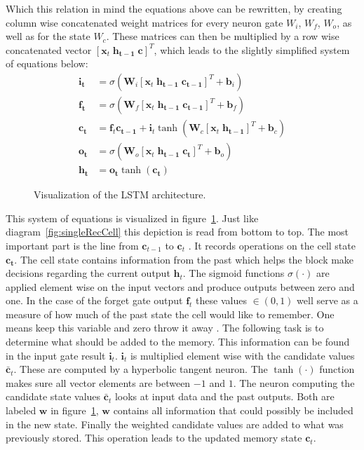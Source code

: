 Which this relation in mind the equations above can be rewritten, by creating column wise concatenated weight matrices for every neuron gate $W_i$, $W_f$, $W_o$, as well as for the state $W_c$. These matrices can then be multiplied by a row wise concatenated vector $[\mathbf{x}_t \; \mathbf{h_{t-1}} \; \mathbf{c}]^T$, which leads to the slightly simplified system of equations below:
\begin{align}
\mathbf{i_t} &= \sigma (\mathbf{W}_i [\mathbf{x}_t \; \mathbf{h_{t-1}} \; \mathbf{c_{t-1}}]^T + \mathbf{b}_i) \\
\mathbf{f_t} &= \sigma (\mathbf{W}_f [\mathbf{x}_t \; \mathbf{h_{t-1}} \; \mathbf{c_{t-1}}]^T + \mathbf{b}_f) \\
\mathbf{c_t} &= \mathbf{f}_t \mathbf{c_{t-1}} + \mathbf{i}_t \tanh( \mathbf{W}_c [\mathbf{x}_t \; \mathbf{h_{t-1}}]^T + \mathbf{b}_c ) \\
\mathbf{o_t} &= \sigma (\mathbf{W}_o [\mathbf{x}_t \; \mathbf{h_{t-1}} \; \mathbf{c_t}]^T + \mathbf{b}_o ) \\
\mathbf{h_t} &= \mathbf{o_t} \tanh(\mathbf{c_t})
\end{align}
\begin{figure}

\caption{Visualization of the LSTM architecture.}
\label{fig:lstm}
\end{figure}
This system of equations is visualized in figure~\ref{fig:lstm}. Just like diagram~\ref{fig:singleRecCell} this depiction is read from bottom to top. The most important part is the line from $\mathbf{c}_{t-1}$ to $\mathbf{c}_{t}$ \cite{Colah2015}. It records operations on the cell state $\mathbf{c_t}$. The cell state contains information from the past which helps the block make decisions regarding the current output $\mathbf{h}_t$. The sigmoid functions $\sigma(\cdot)$ are applied element wise on the input vectors and produce outputs between zero and one. In the case of the forget gate output $\mathbf{f}_t$ these values $\in (0,1)$ well serve as a measure of how much of the past state the cell would like to remember. One means keep this variable and zero throw it away \cite{Colah2015}. 
The following task is to determine what should be added to the memory. This information can be found in the input gate result $\mathbf{i}_t$. $\mathbf{i}_t$ is multiplied element wise with the candidate values $\mathbf{\bar{c}}_t$. These are computed by a hyperbolic tangent neuron.  The $\tanh(\cdot)$ function makes sure all vector elements are between $-1$ and $1$. The neuron computing the candidate state values $\mathbf{\bar{c}}_t$ looks at input data and the past outputs. Both are labeled $\mathbf{w}$ in figure~\ref{fig:lstm}, $\mathbf{w}$ contains all information that could possibly be included in the new state. Finally the weighted candidate values are added to what was previously stored. This operation leads to the updated memory state $\mathbf{c}_t$. 
